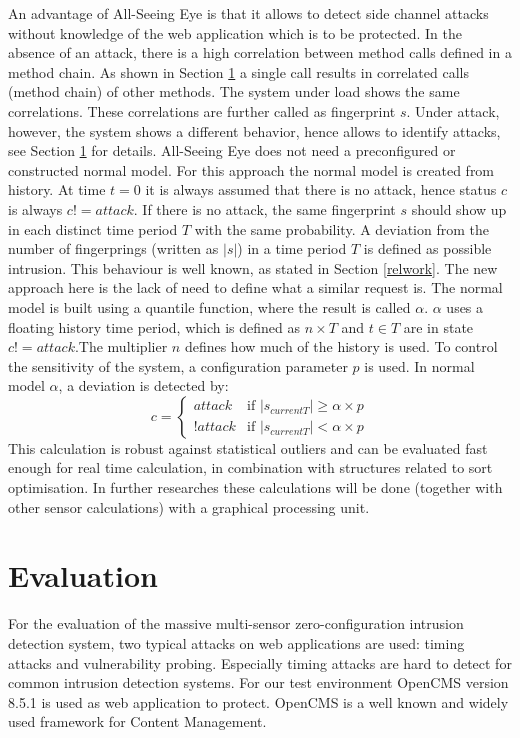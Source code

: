 \documentclass[conference]{IEEEtran}
\begin{document}
An advantage of All-Seeing Eye is that it allows to detect side channel attacks without knowledge of the web application which is to be protected. 
In the absence of an attack, there is  a high correlation between method calls defined in a method chain. As shown in Section \ref{evaluation} a single call results in correlated calls (method chain) of other methods.
 The system under load shows the same correlations. These correlations are further called as fingerprint $s$. 
 Under attack, however, the system shows a different behavior, hence allows to identify attacks, see Section \ref{evaluation} for details.
All-Seeing Eye does not need a preconfigured or constructed normal model. For this approach the normal model is created from history.
At time $t=0$ it is always assumed that there is no attack, hence status $c$ is always $c!=attack$. 
If there is no attack, the same fingerprint $s$ should show up in each distinct time period $T$ with the same probability.
A deviation from the number of fingerprings (written as $|s|$) in a time period $T$ is defined as possible intrusion.
This behaviour is well known, as stated in Section \ref{relwork}. The new approach here is the lack of need to define what a similar request is.
The normal model is built using a quantile function, where the result is called  $\alpha$.
$\alpha$ uses a floating history time period, which is defined as $n \times T$ and $t \in T$ are in state $c!=attack$.The multiplier $n$ defines how much of the history is used. To control the sensitivity of the system, a configuration parameter $p$ is used.
In normal model $\alpha$, a deviation is detected by:
\begin{equation}
c=\begin{cases}
attack & \text{if } |s_{currentT}| \geq \alpha \times p\\
!attack & \text{if } |s_{currentT}| < \alpha \times p
\end{cases}
\end{equation}
This calculation is robust against statistical outliers and can be evaluated fast enough for real time calculation, in combination with structures related to sort optimisation. In further researches these calculations will be done (together with other sensor calculations) with a graphical processing unit.




\section{Evaluation}\label{evaluation}
For the evaluation of the massive multi-sensor zero-configuration intrusion detection system, two typical attacks on web applications are used: timing attacks and vulnerability probing. Especially timing attacks are hard to detect for common intrusion detection systems.
For our test environment OpenCMS version 8.5.1 \cite{opencms_2013} is used as web application to protect. OpenCMS is a well known and widely used framework for Content Management. 
\end{document}
